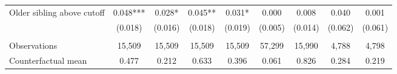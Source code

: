 {{\begin{tabular}{lcccccccc}
Older sibling above cutoff&       0.048***&       0.028*  &       0.045** &       0.031*  &       0.000   &       0.008   &       0.040   &       0.001   \\
                    &     (0.018)   &     (0.016)   &     (0.018)   &     (0.019)   &     (0.005)   &     (0.014)   &     (0.062)   &     (0.061)   \\
                    &               &               &               &               &               &               &               &               \\
Observations        &      15,509   &      15,509   &      15,509   &      15,509   &      57,299   &      15,990   &       4,788   &       4,798   \\
Counterfactual mean &       0.477   &       0.212   &       0.633   &       0.396   &       0.061   &       0.826   &       0.284   &       0.219   \\
 

\bottomrule
\end{tabular}
}
}
